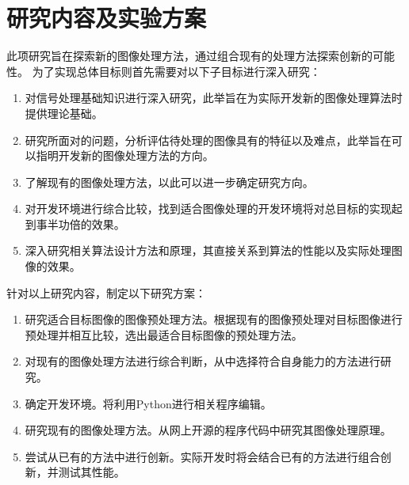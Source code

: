 %
%
%
%

\section{研究内容及实验方案}

此项研究旨在探索新的图像处理方法，通过组合现有的处理方法探索创新的可能性。
为了实现总体目标则首先需要对以下子目标进行深入研究：
\begin{enumerate}[label=\arabic*)]
    \item 对信号处理基础知识进行深入研究，此举旨在为实际开发新的图像处理算法时提供理论基础。
    \item 研究所面对的问题，分析评估待处理的图像具有的特征以及难点，此举旨在可以指明开发新的图像处理方法的方向。
    \item 了解现有的图像处理方法，以此可以进一步确定研究方向。
    \item 对开发环境进行综合比较，找到适合图像处理的开发环境将对总目标的实现起到事半功倍的效果。
    \item 深入研究相关算法设计方法和原理，其直接关系到算法的性能以及实际处理图像的效果。
\end{enumerate}


针对以上研究内容，制定以下研究方案：
\begin{enumerate}[label=\arabic*)]
    \item 研究适合目标图像的图像预处理方法。根据现有的图像预处理对目标图像进行预处理并相互比较，选出最适合目标图像的预处理方法。
    \item 对现有的图像处理方法进行综合判断，从中选择符合自身能力的方法进行研究。
    \item 确定开发环境。将利用Python进行相关程序编辑。
    \item 研究现有的图像处理方法。从网上开源的程序代码中研究其图像处理原理。
    \item 尝试从已有的方法中进行创新。实际开发时将会结合已有的方法进行组合创新，并测试其性能。
\end{enumerate}

